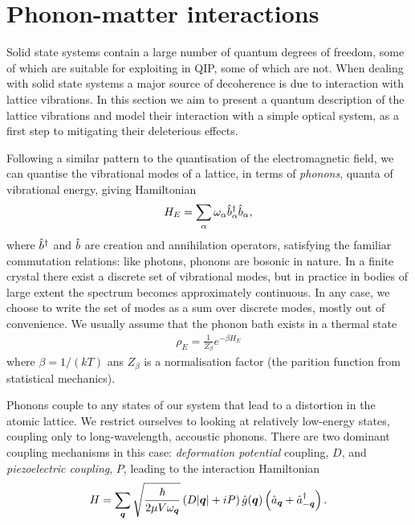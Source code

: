 \section{Phonon-matter interactions}\label{phonon_me}

Solid state systems contain a large number of quantum degrees of freedom, some of which are suitable for exploiting in QIP, some of which are not. When dealing with solid state systems a major source of decoherence is due to interaction with lattice vibrations. In this section we aim to present a quantum description of the lattice vibrations and model their interaction with a simple optical system, as a first step to mitigating their deleterious effects.

Following a similar pattern to the quantisation of the electromagnetic field, we can quantise the vibrational modes of a lattice, in terms of \textit{phonons}, quanta of vibrational energy, giving Hamiltonian
\begin{align}
  H_E = \sum_\alpha \omega_\alpha \hat{b}^\dagger_\alpha \hat{b}_\alpha,
\end{align}
where $\hat{b}^\dagger$ and $\hat{b}$ are creation and annihilation operators, satisfying the familiar commutation relations: like photons, phonons are bosonic in nature. In a finite crystal there exist a discrete set of vibrational modes, but in practice in bodies of large extent the spectrum becomes approximately continuous. In any case, we choose to write the set of modes as a sum over discrete modes, mostly out of convenience. We usually assume that the phonon bath exists in a thermal state
\begin{align}
  \rho_E = \frac{1}{Z_\beta} e^{-\beta H_E}
\end{align}
where $\beta = 1/(kT)$ ans $Z_\beta$ is a normalisation factor (the parition function from statistical mechanics).

Phonons couple to any states of our system that lead to a distortion in the atomic lattice. We restrict ourselves to looking at relatively low-energy states, coupling only to long-wavelength, accoustic phonons. There are two dominant coupling mechanisms in this case: \textit{deformation potential} coupling, $D$, and \textit{piezoelectric coupling}, $P$, \cite{mahan} leading to the interaction Hamiltonian
\begin{align}
  H = \sum_{{\boldsymbol{q}}} \sqrt{\frac{\hbar}{2\mu V\omega_{{\boldsymbol{q}}}}} \left(D \vert {\boldsymbol{q}}\vert + iP \right)\hat{g}({\boldsymbol{q}})\left(\hat{a}_{{\boldsymbol{q}}} + \hat{a}^\dagger_{-{\boldsymbol{q}}} \right).
\end{align}

